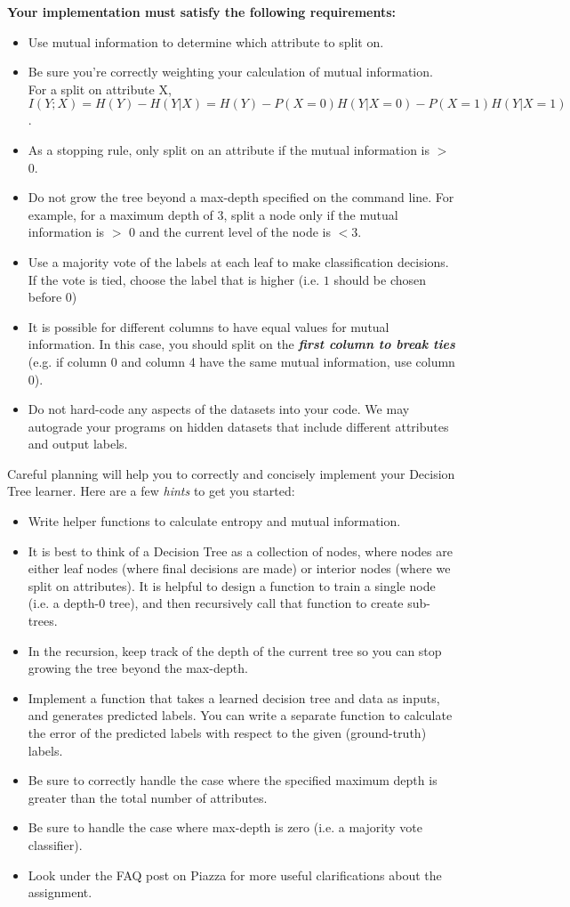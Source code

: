 \clearpage
\textbf{Your implementation must satisfy the following requirements:}
\begin{itemize}
\item Use mutual information to determine which attribute to split on.
\item Be sure you’re correctly weighting your calculation of mutual information. For a split on attribute X, $I(Y;X) = H(Y)-H(Y|X) = H(Y) - P(X=0)H(Y|X = 0) - P(X = 1)H(Y|X = 1)$.
\item As a stopping rule, only split on an attribute if the mutual information is $>$ 0. 
\item Do not grow the tree beyond a max-depth specified on the command line. For example, for a maximum depth of 3, split a node only if the mutual information is $>$ 0 and the current level of the node is $< 3$.
\item Use a majority vote of the labels at each leaf to make classification decisions. If the vote is tied, choose the label that is higher (i.e. $1$ should be chosen before $0$)
\item It is possible for different columns to have equal values for mutual information. In this case, you should split on the \emph{\textbf{first column to break ties}} (e.g. if column 0 and column 4 have the same mutual information, use column 0).
\item Do not hard-code any aspects of the datasets into your code. We may autograde your programs on hidden datasets that include different attributes and output labels.
\end{itemize}

Careful planning will help you to correctly and concisely implement your Decision Tree learner. Here are a few \emph{hints} to get you started:
\begin{itemize}
    \item Write helper functions to calculate entropy and mutual information.
    \item It is best to think of a Decision Tree as a collection of nodes, where nodes are either leaf nodes (where final decisions are made) or interior nodes (where we split on attributes). It is helpful to design a function to train a single node (i.e. a depth-0 tree), and then recursively call that function to create sub-trees.
    \item In the recursion, keep track of the depth of the current tree so you can stop growing the tree beyond the max-depth.
    \item Implement a function that takes a learned decision tree and data as inputs, and generates predicted labels. You can write a separate function to calculate the error of the predicted labels with respect to the given (ground-truth) labels.
    \item Be sure to correctly handle the case where the specified maximum depth is greater than the total number of attributes.
    \item Be sure to handle the case where max-depth is zero (i.e. a majority vote classifier). 
    \item Look under the FAQ post on Piazza for more useful clarifications about the assignment.
\end{itemize}

